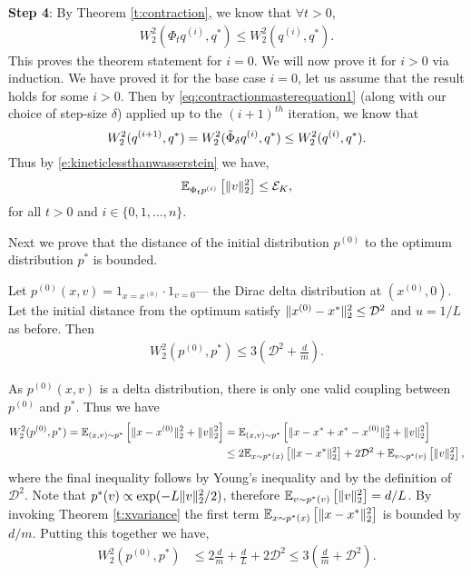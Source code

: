 \begin{Proof}
\textbf{Step 4}:
By Theorem \ref{t:contraction}, we know that $\forall t > 0$, 
\begin{align*}
W_2^2 (\Phi_t q^{(i)}, q^*)\leq W_2^2 (q^{(i)}, q^*). 
\end{align*}
This proves the theorem statement for $i = 0$. We will now prove it for $i > 0$ via induction. We have proved it for the base case $i=0$, let us assume that the result holds for some $i>0$. Then by \eqref{eq:contractionmasterequation1} (along with our choice of step-size $\delta$) applied up to the $(i+1)^{th}$ iteration, we know that 
$$W_2^2 (q^{(i+1)},q^*) = W_2^2 (\tilde{\Phi}_\delta q^{(i)},q^*)\leq W_2^2(q^{(i)},q^*). $$
Thus by \eqref{e:kineticlessthanwasserstein} we have, 
$$\mathbb{E}_{\Phi_{t} p^{(i)}}\left[\|v\|_2^2\right]\leq \mathcal{E}_K,$$
for all $t>0$ and $i \in \{0,1,\ldots,n \}$.
\end{Proof}
Next we prove that the distance of the initial distribution $p^{(0)}$ to the optimum distribution $p^*$ is bounded.
\begin{lemma}\label{lem:initialdistancebound} Let $p^{(0)}(x,v) =1_{x=x^{(0)}} \cdot 1_{v=0}$--- the Dirac delta distribution at $(x^{(0)},0)$. Let the initial distance from the optimum satisfy $\lVert x^{(0)}-x^* \rVert_2^2 \le \mathcal{D}^2$ and $u=1/L$ as before. Then
\begin{align*}
W_2^2(p^{(0)},p^*) \le 3\left( \mathcal{D}^2 + \frac{d}{m} \right).
\end{align*}
\end{lemma}
\begin{Proof} As $p^{(0)}(x,v)$ is a delta distribution, there is only one valid coupling between $p^{(0)}$ and $p^*$. Thus we have
\begin{align*}
W_2^2(p^{(0)},p^*)  = \mathbb{E}_{(x,v) \sim p^*}\left[\lVert x-x^{(0)}\rVert_2^2 + \lVert v \rVert_2^2 \right] & =\mathbb{E}_{(x,v) \sim p^*}\left[\lVert x-x^* + x^* - x^{(0)}\rVert_2^2 + \lVert v \rVert_2^2 \right] \\
& \le 2\mathbb{E}_{x \sim p^*(x)}\left[\lVert x-x^*\rVert_2^2 \right] + 2\mathcal{D}^2 + \mathbb{E}_{v \sim p^*(v)}\left[\lVert v \rVert_2^2 \right],
\end{align*}
where the final inequality follows by Young's inequality and by the definition of $\mathcal{D}^2$. Note that $p^*(v) \propto \exp(-L\lVert v\rVert_2^2/2)$, therefore $\mathbb{E}_{v \sim p^*(v)}\left[\lVert v \rVert_2^2 \right] = d/L$. By invoking Theorem \ref{t:xvariance} the first term $\mathbb{E}_{x \sim p^*(x)}\left[\lVert x-x^*\rVert_2^2 \right]$ is bounded by $d/m$. Putting this together we have,
\begin{align*}
W_2^2(p^{(0)},p^*) & \le 2\frac{d}{m} + \frac{d}{L} + 2\mathcal{D}^2 \le 3\left(\frac{d}{m} + \mathcal{D}^2 \right).
\end{align*} 
\end{Proof}